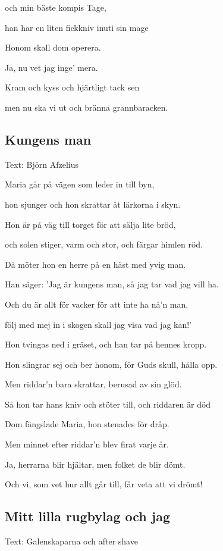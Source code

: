 och min bäste kompis Tage,

han har en liten fickkniv inuti sin mage\bigskip

Honom skall dom operera.

Ja, nu vet jag inge’ mera.

Kram och kyss och hjärtligt tack sen

men nu ska vi ut och bränna grannbaracken.\bigskip

\subsection{\textbf{Kungens man }}

Text: Björn Afzelius\bigskip


Maria går på vägen som leder in till byn,

hon sjunger och hon skrattar åt lärkorna i skyn.

Hon är på väg till torget för att sälja lite bröd,

och solen stiger, varm och stor, och färgar himlen röd.\bigskip

Då möter hon en herre på en häst med yvig man.

Han säger: 'Jag är kungens man, så jag tar vad jag vill ha.

Och du är allt för vacker för att inte ha nå'n man,

följ med mej in i skogen skall jag visa vad jag kan!'\bigskip

Hon tvingas ned i gräset, och han tar på hennes kropp.

Hon slingrar sej och ber honom, för Guds skull, hålla opp.

Men riddar'n bara skrattar, berusad av sin glöd.

Så hon tar hans kniv och stöter till, och riddaren är död\bigskip

Dom fängslade Maria, hon stenades för dråp.

Men minnet efter riddar'n blev firat varje år.

Ja, herrarna blir hjältar, men folket de blir dömt.

Och vi, som vet hur allt går till, får veta att vi drömt!\bigskip

\subsection{\textbf{Mitt lilla rugbylag och jag}}

Text: Galenskaparna och after shave \bigskip


